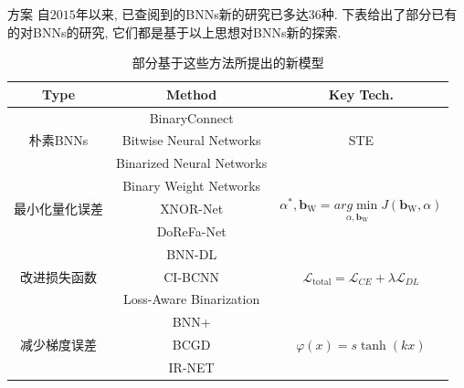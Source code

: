 \documentclass{beamer}
\begin{document}
\begin{frame}{方案}
\footnotesize
自$2015$年以来, 已查阅到的BNNs新的研究已多达$36$种. 下表给出了部分已有的对BNNs的研究, 它们都是基于以上思想对BNNs新的探索.
\begin{table}[H]
    \centering
    \footnotesize
    \caption{部分基于这些方法所提出的新模型}
    \vspace*{-0.3cm}
    \label{tab:impmode}
    \begin{tabular}{ccc}
    \hline
    Type                     & Method                     & Key Tech.          \\ \hline
    \multirow{3}{*}{朴素BNNs}  & BinaryConnect              & \multirow{3}{*}{STE} \\
                             & Bitwise Neural Networks    &                    \\
                             & Binarized Neural Networks  &                    \\ \hline
    \multirow{3}{*}{最小化量化误差} & Binary Weight Networks    & \multirow{3}{*}{$ \alpha ^*,\mathbf{b}_{\mathrm{W}}=\underset{\alpha ,\mathbf{b}_{\mathrm{W}}}{arg\min}J\left( \mathbf{b}_{\mathrm{W}},\alpha \right)  $} \\
                             & XNOR-Net                   &                    \\
                             & DoReFa-Net                 &                    \\ \hline
    \multirow{3}{*}{改进损失函数}  & BNN-DL                     & \multirow{3}{*}{$\mathcal{L} _{\mathrm{total}}=\mathcal{L} _{CE}+\lambda \mathcal{L} _{DL}$} \\
                             & CI-BCNN                    &                    \\
                             & Loss-Aware Binarization    &                    \\ \hline
    \multirow{3}{*}{减少梯度误差}  & BNN+                       & \multirow{3}{*}{$\varphi \left( x \right) =s\tanh \left( kx \right) $} \\
                             & BCGD   &                    \\
                             & IR-NET &                    \\ \hline
    \end{tabular}%
    \end{table}
\end{frame}
\end{document}
